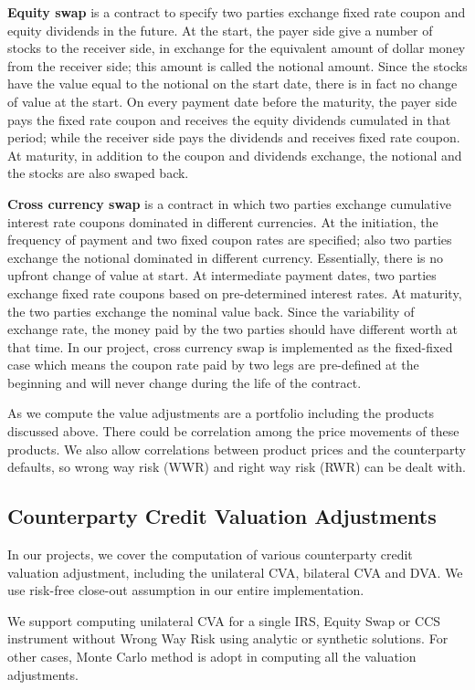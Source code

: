 \textbf{Equity swap} is a contract to specify two parties exchange fixed rate coupon and equity dividends in the future. At the start, the payer side give a number of stocks to the receiver side, in exchange for the equivalent amount of dollar money from the receiver side; this amount is called the notional amount. Since the stocks have the value equal to the notional on the start date, there is in fact no change of value at the start. On every payment date before the maturity, the payer side pays the fixed rate coupon and receives the equity dividends cumulated in that period; while the receiver side pays the dividends and receives fixed rate coupon. At maturity, in addition to the coupon and dividends exchange, the notional and the stocks are also swaped back.

\textbf{Cross currency swap} is a contract in which two parties exchange cumulative interest rate coupons dominated in different currencies. At the initiation, the frequency of payment and two fixed coupon rates are specified; also two parties exchange the notional dominated in different currency. Essentially, there is no upfront change of value at start. At intermediate payment dates, two parties exchange fixed rate coupons based on pre-determined interest rates. At maturity, the two parties exchange the nominal value back. Since the variability of exchange rate, the money paid by the two parties should have different worth at that time. In our project, cross currency swap is implemented as the fixed-fixed case which means the coupon rate paid by two legs are pre-defined at the beginning and will never change during the life of the contract.

As we compute the value adjustments are a portfolio including the products discussed above. There could be correlation among the price movements of these products. We also allow correlations between product prices and the counterparty defaults, so wrong way risk (WWR) and right way risk (RWR) can be dealt with.

\subsection{Counterparty Credit Valuation Adjustments}
In our projects, we cover the computation of various counterparty credit valuation adjustment, including the unilateral CVA, bilateral CVA and DVA. We use risk-free close-out assumption in our entire implementation.

We support computing unilateral CVA for a single IRS, Equity Swap or CCS instrument without Wrong Way Risk using analytic or synthetic solutions. For other cases, Monte Carlo method is adopt in computing all the valuation adjustments.

